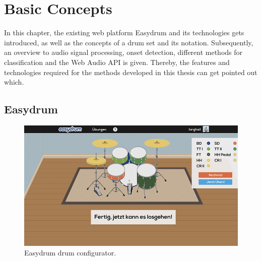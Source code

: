 \section{Basic Concepts}
\label{section:basicConcepts}

In this chapter, the existing web platform Easydrum and its technologies gets introduced, as well as the concepts of a drum set and its notation. Subsequently, an overview to audio signal processing, onset detection, different methods for classification and the Web Audio API is given. Thereby, the features and technologies required for the methods developed in this thesis can get pointed out which.

\subsection{Easydrum} \label{section:Easydrum}

\begin{figure}[ht]
	\centering
	\includegraphics[width=\textwidth]{images/Easydrum/configuratorscreen.png}
	\caption{Easydrum drum configurator.}
	\label{fig:configuratorscreen}
\end{figure}

